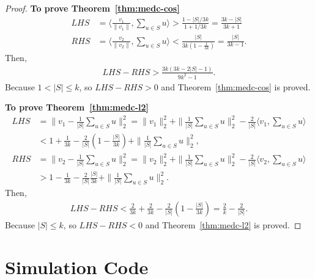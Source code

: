 \begin{proof}
\textbf{To prove Theorem~\ref{thm:medc-cos}}
\begin{align}
    LHS &= \langle \frac{v_1}{\|v_1\|}, \sum_{u\in S} u \rangle > \frac{1 - |S| / 3k}{1 + 1/3k} = \frac{3k-|S|}{3k + 1} \\
    RHS &= \langle \frac{v_2}{\|v_2\|}, \sum_{u\in S} u \rangle < \frac{|S|}{3k(1-\frac{1}{3k})} = \frac{|S|}{3k-1}.
\end{align}
Then, 
\begin{align}
    LHS - RHS  > \frac{3k(3k - 2|S| -1)}{9k^2-1}.
\end{align}
Because $1 < |S| \leq k$, so $LHS - RHS > 0$ and Theorem~\ref{thm:medc-cos} is proved.

\textbf{To prove Theorem~\ref{thm:medc-l2}}
\begin{align}
    LHS & = \|v_1 - \frac{1}{|S|} \sum_{u\in S} u \|_2^2 = \|v_1\|_2^2 + \|\frac{1}{|S|} \sum_{u\in S} u \|_2^2 - \frac{2}{|S|}\langle v_1, \sum_{u\in S} u \rangle\\
    & < 1+\frac{1}{3k} - \frac{2}{|S|}(1-\frac{|S|}{3k})  + \|\frac{1}{|S|} \sum_{u\in S} u \|_2^2, \\
    RHS & = \|v_2 - \frac{1}{|S|} \sum_{u\in S} u \|_2^2 = \|v_2\|_2^2 + \|\frac{1}{|S|} \sum_{u\in S} u \|_2^2 - \frac{2}{|S|}\langle v_2, \sum_{u\in S} u \rangle \\
    & >  1-\frac{1}{3k} - \frac{2}{|S|}\frac{|S|}{3k} + \|\frac{1}{|S|} \sum_{u\in S} u \|_2^2.
\end{align}
Then,
\begin{align}
    LHS - RHS < \frac{2}{3k} + \frac{2}{3k} - \frac{2}{|S|}(1-\frac{|S|}{3k}) = \frac{2}{k} - \frac{2}{|S|}.
\end{align}
Because $|S| \leq k$, so $LHS - RHS < 0$ and Theorem~\ref{thm:medc-l2} is proved.
\end{proof}

\section{Simulation Code}\label{app:code}

